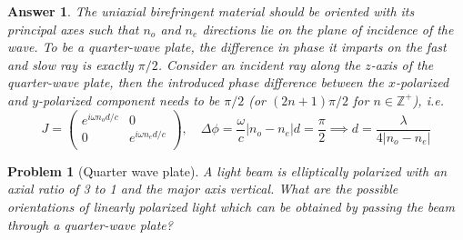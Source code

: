 \documentclass[a4paper]{article}
\newtheorem{ans}{Answer}[section]
\theoremstyle{new}
\newtheorem{qns}{Problem}[section]
\begin{document}
\begin{ans}
The uniaxial birefringent material should be oriented with its principal axes such that $n_o$ and $n_e$ directions lie on the plane of incidence of the wave. To be a quarter-wave plate, the difference in phase it imparts on the fast and slow ray is exactly $\pi/2$. Consider an incident ray along the $z$-axis of the quarter-wave plate, then the introduced phase difference between the $x$-polarized and $y$-polarized component needs to be $\pi/2$ (or $(2n+1)\pi/2$ for $n\in\mathbb{Z}^+$), i.e.
$$J=\begin{pmatrix}e^{i\omega n_od/c}&0\\0&e^{i\omega n_ed/c}\\\end{pmatrix},\quad\Delta\phi=\frac{\omega}{c}|n_o-n_e|d=\frac{\pi}{2}\implies d=\frac{\lambda}{4|n_o-n_e|}$$
\end{ans}
\begin{qns}[Quarter wave plate]
A light beam is elliptically polarized with an axial ratio of 3 to 1 and the major axis vertical. What are the possible orientations of linearly polarized light which can be obtained by passing the beam through a quarter-wave plate?
\end{qns}
\end{document}
